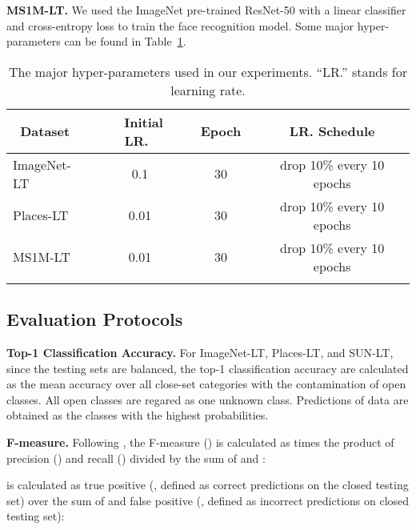 \documentclass[10pt,twocolumn,letterpaper]{article}
\begin{document}
\vspace{2pt}
\noindent
\textbf{MS1M-LT.}
We used the ImageNet pre-trained ResNet-50 with a linear classifier and cross-entropy loss to train the  face recognition model.
Some major hyper-parameters can be found in Table~\ref{tab:parameters}.




\begin{table}[h]
    \footnotesize
    \centering
    \begin{tabular}{l|c|c|c}
    \Xhline{1pt}
    ~{\bf Dataset}~ & ~{\bf Initial LR.}~ & ~{\bf Epoch}~ & ~{\bf LR. Schedule}~ \\ \hline \hline
    ImageNet-LT & 0.1  & 30 & drop 10\% every 10 epochs \\ \hline
    Places-LT & 0.01 & 30 & drop 10\% every 10 epochs \\ \hline
    MS1M-LT & 0.01 & 30 & drop 10\% every 10 epochs \\
    \Xhline{1pt}
    \end{tabular}
    \vspace{-6pt}
    \caption{The major hyper-parameters used in our experiments. ``LR.'' stands for learning rate.}
    \label{tab:parameters}
\end{table}



\subsection{Evaluation Protocols}

\vspace{2pt}
\noindent
\textbf{Top-1 Classification Accuracy.}
For ImageNet-LT, Places-LT, and SUN-LT, since the testing sets are balanced, the top-1 classification accuracy are calculated as the mean accuracy over all close-set categories with the contamination of open classes.
All open classes are regared as one unknown class.
Predictions of data are obtained as the classes with the highest  probabilities. 



\vspace{2pt}
\noindent
\textbf{F-measure.}
Following \cite{bendale2016towards}, the F-measure () is calculated as  times the product of precision () and recall () divided by the sum of  and :

 is calculated as true positive (, defined as correct predictions on the closed testing set) over the sum of  and false positive (, defined as incorrect predictions on closed testing set):
\end{document}
